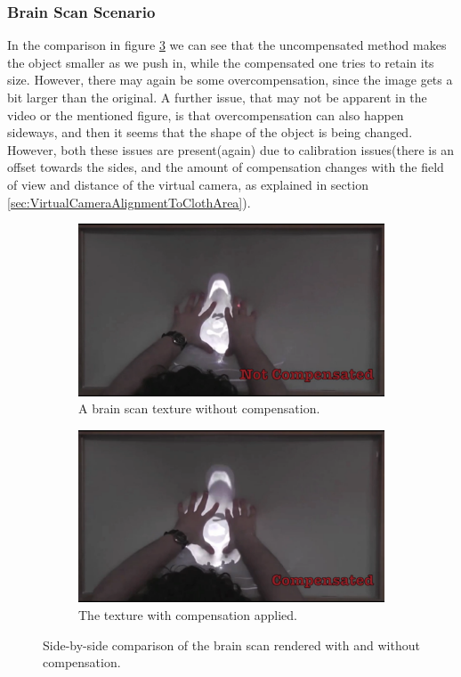 \documentclass[]{article}
\begin{document}
\subsubsection{Brain Scan Scenario}

In the comparison in figure \ref{fig:BrainScanComparison} we can see that the uncompensated method makes the object smaller as we push in, while the compensated one tries to retain its size. However, there may again be some overcompensation, since the image gets a bit larger than the original. A further issue, that may not be apparent in the video or the mentioned figure, is that overcompensation can also happen sideways, and then it seems that the shape of the object is being changed. However, both these issues are present(again) due to calibration issues(there is an offset towards the sides, and the amount of compensation changes with the field of view and distance of the virtual camera, as explained in section \ref{sec:VirtualCameraAlignmentToClothArea}).

\begin{figure}[!h]
\centering
\begin{subfigure}{.5\textwidth}
  \centering
  \includegraphics[width=0.9\linewidth]{figures/compensation/BrainScanNotCompensated.png}
  \caption{A brain scan texture without compensation.}
  \label{fig:BrainScanNotCompensated}
\end{subfigure}%
\begin{subfigure}{.5\textwidth}
  \centering
  \includegraphics[width=0.9\linewidth]{figures/compensation/BrainScanCompensated.png}
  \caption{The texture with compensation applied.}
  \label{fig:BrainScanCompensated}
\end{subfigure}
\caption{Side-by-side comparison of the brain scan rendered with and without compensation.}
\label{fig:BrainScanComparison}
\end{figure}
\end{document}
